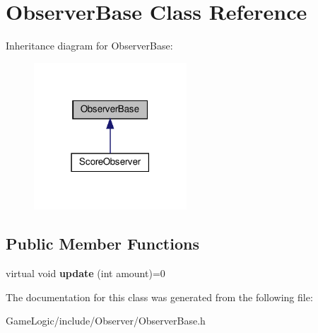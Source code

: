 \hypertarget{classObserverBase}{}\section{Observer\+Base Class Reference}
\label{classObserverBase}


Inheritance diagram for Observer\+Base\+:\nopagebreak
\begin{figure}[H]
\begin{center}
\leavevmode
\includegraphics[width=162pt]{classObserverBase__inherit__graph}
\end{center}
\end{figure}
\subsection*{Public Member Functions}
\begin{DoxyCompactItemize}
\item 
\mbox{\label{classObserverBase_ae174a3136f06a9e17a7410f02aab1480}} 
virtual void {\bfseries update} (int amount)=0
\end{DoxyCompactItemize}


The documentation for this class was generated from the following file\+:\begin{DoxyCompactItemize}
\item 
Game\+Logic/include/\+Observer/Observer\+Base.\+h\end{DoxyCompactItemize}
